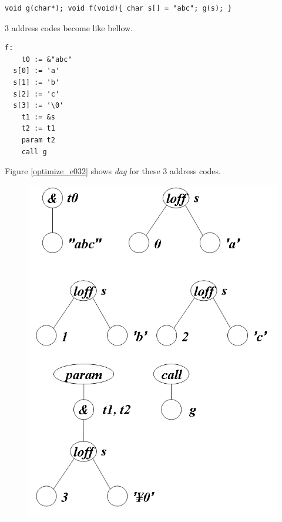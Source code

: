 \begin{Example}
\label{optimize_e031}
\begin{verbatim}
void g(char*); void f(void){ char s[] = "abc"; g(s); }
\end{verbatim}
3 address codes become like bellow.
\begin{verbatim}
f:
    t0 := &"abc"
  s[0] := 'a'
  s[1] := 'b'
  s[2] := 'c'
  s[3] := '\0'
    t1 := &s
    t2 := t1
    param t2
    call g
\end{verbatim}
Figure \ref{optimize_e032} shows {\em dag} for these 3 address codes.
\begin{figure}[htbp]
\begin{center}
\begin{htmlonly}
\includegraphics[width=0.859\linewidth,height=1.0\linewidth]{opt016.png}
\end{htmlonly}
\begin{latexonly}

\end{latexonly}
\end{center}
\end{figure}
\end{Example}
